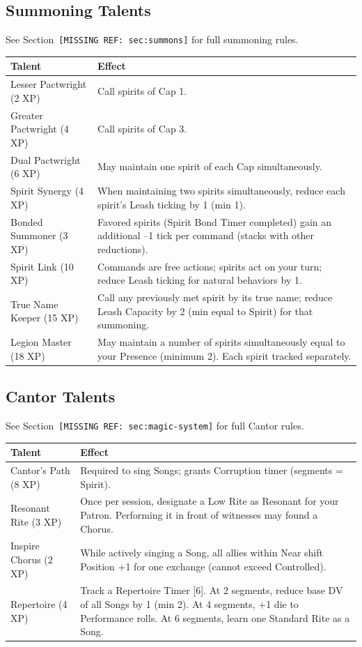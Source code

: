\subsection{Summoning Talents}

See Section~\texttt{[MISSING REF: sec:summons]} for full summoning rules.

\begin{tabular}{@{}lp{10cm}@{}}
\toprule
\textbf{Talent} & \textbf{Effect} \\
\midrule
Lesser Pactwright (2 XP) & Call spirits of Cap 1. \\
Greater Pactwright (4 XP) & Call spirits of Cap 3. \\
Dual Pactwright (6 XP) & May maintain one spirit of each Cap simultaneously. \\
Spirit Synergy (4 XP) & When maintaining two spirits simultaneously, reduce each spirit's Leash ticking by 1 (min 1). \\
Bonded Summoner (3 XP) & Favored spirits (Spirit Bond Timer completed) gain an additional --1 tick per command (stacks with other reductions). \\
Spirit Link (10 XP) & Commands are free actions; spirits act on your turn; reduce Leash ticking for natural behaviors by 1. \\
True Name Keeper (15 XP) & Call any previously met spirit by its true name; reduce Leash Capacity by 2 (min equal to Spirit) for that summoning. \\
Legion Master (18 XP) & May maintain a number of spirits simultaneously equal to your Presence (minimum 2). Each spirit tracked separately. \\
\bottomrule
\end{tabular}

\subsection{Cantor Talents}

See Section~\texttt{[MISSING REF: sec:magic-system]} for full Cantor rules.

\begin{tabular}{@{}lp{10cm}@{}}
\toprule
\textbf{Talent} & \textbf{Effect} \\
\midrule
Cantor's Path (8 XP) & Required to sing Songs; grants Corruption timer (segments = Spirit). \\
Resonant Rite (3 XP) & Once per session, designate a Low Rite as Resonant for your Patron. Performing it in front of witnesses may found a Chorus. \\
Inspire Chorus (2 XP) & While actively singing a Song, all allies within Near shift Position +1 for one exchange (cannot exceed Controlled). \\
Repertoire (4 XP) & Track a Repertoire Timer [6]. At 2 segments, reduce base DV of all Songs by 1 (min 2). At 4 segments, +1 die to Performance rolls. At 6 segments, learn one Standard Rite as a Song. \\
\bottomrule
\end{tabular}

